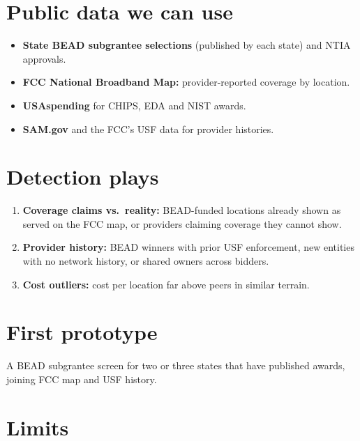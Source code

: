 \documentclass[letterpaper,11pt]{article}
\providecommand{\tightlist}{\setlength{\itemsep}{0pt}\setlength{\parskip}{0pt}}
\begin{document}
\hypertarget{public-data-we-can-use}{%
\section{Public data we can use}\label{public-data-we-can-use}}

\begin{itemize}
\tightlist
\item
  \textbf{State BEAD subgrantee selections} (published by each state)
  and NTIA approvals.
\item
  \textbf{FCC National Broadband Map:} provider-reported coverage by
  location.
\item
  \textbf{USAspending} for CHIPS, EDA and NIST awards.
\item
  \textbf{SAM.gov} and the FCC's USF data for provider histories.
\end{itemize}

\hypertarget{detection-plays}{%
\section{Detection plays}\label{detection-plays}}

\begin{enumerate}
\def\labelenumi{\arabic{enumi}.}
\tightlist
\item
  \textbf{Coverage claims vs.~reality:} BEAD-funded locations already
  shown as served on the FCC map, or providers claiming coverage they
  cannot show.
\item
  \textbf{Provider history:} BEAD winners with prior USF enforcement,
  new entities with no network history, or shared owners across bidders.
\item
  \textbf{Cost outliers:} cost per location far above peers in similar
  terrain.
\end{enumerate}

\hypertarget{first-prototype}{%
\section{First prototype}\label{first-prototype}}

A BEAD subgrantee screen for two or three states that have published
awards, joining FCC map and USF history.

\hypertarget{limits}{%
\section{Limits}\label{limits}}
\end{document}
